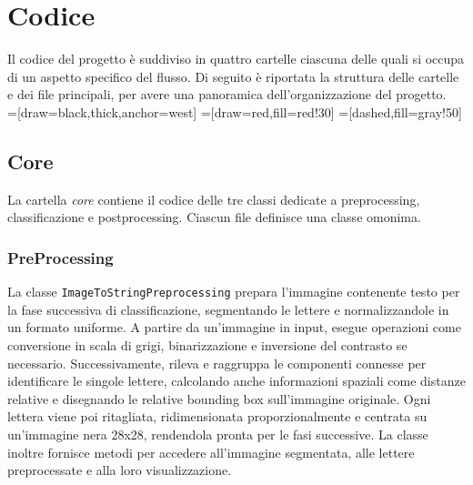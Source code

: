 \chapter{Codice}
Il codice del progetto è suddiviso in quattro cartelle ciascuna delle quali si occupa di un aspetto specifico del flusso. Di seguito è riportata la struttura delle cartelle e dei file principali, per avere una panoramica dell'organizzazione del progetto. \\ 

=[draw=black,thick,anchor=west]
=[draw=red,fill=red!30]
=[dashed,fill=gray!50]

\section{Core}
La cartella \emph{core} contiene il codice delle tre classi dedicate a preprocessing, classificazione e postprocessing. Ciascun file definisce una classe omonima.

\subsection{PreProcessing}
La classe \texttt{ImageToStringPreprocessing} prepara l'immagine contenente testo per la fase successiva di classificazione, segmentando le lettere e normalizzandole in un formato uniforme. A partire da un'immagine in input, esegue operazioni come conversione in scala di grigi, binarizzazione e inversione del contrasto se necessario. 
Successivamente, rileva e raggruppa le componenti connesse per identificare le singole lettere, calcolando anche informazioni spaziali come distanze relative e disegnando le relative bounding box sull'immagine originale.
Ogni lettera viene poi ritagliata, ridimensionata proporzionalmente e centrata su un'immagine nera 28x28, rendendola pronta per le fasi successive. La classe inoltre fornisce metodi per accedere all'immagine segmentata, alle lettere preprocessate e alla loro visualizzazione.

